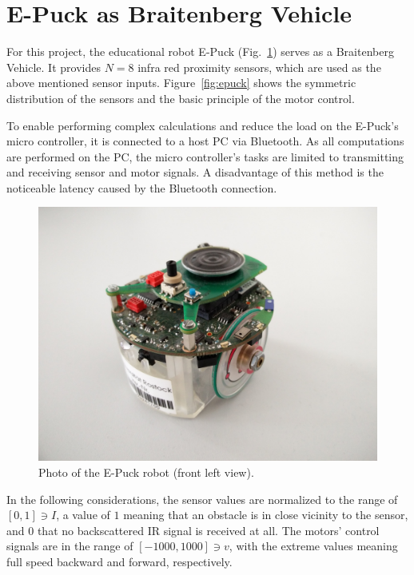 \documentclass[a4paper]{jacow}
\begin{document}
\section{E-Puck as Braitenberg Vehicle}

For this project, the educational robot E-Puck (Fig.~\ref{fig:epuck_photo}) serves as a Braitenberg Vehicle. It provides $N=8$ infra red proximity sensors, which are used as the above mentioned sensor inputs. Figure~\ref{fig:epuck} shows the symmetric distribution of the sensors and the basic principle of the motor control.

To enable performing complex calculations and reduce the load on the E-Puck's micro controller, it is connected to a host PC via Bluetooth. As all computations are performed on the PC, the micro controller's tasks are limited to transmitting and receiving sensor and motor signals. A disadvantage of this method is the noticeable latency caused by the Bluetooth connection.

\begin{figure}[hbt]
	\centering
	\includegraphics[width=\linewidth]{epuck.jpg}
	\caption{Photo of the E-Puck robot (front left view).}
	\label{fig:epuck_photo}
\end{figure}

In the following considerations, the sensor values are normalized to the range of $[0,1]\ni I$, a value of $1$ meaning that an obstacle is in close vicinity to the sensor, and $0$ that no backscattered IR signal is received at all. The motors' control signals are in the range of $[-1000,1000]\ni v$, with the extreme values meaning full speed backward and forward, respectively.
\end{document}
